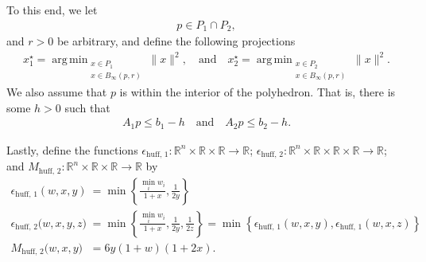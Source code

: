 \documentclass{article}
\newenvironment{comment}
  {\par\medskip
   \color{red}%
   \begin{framed}
   \textbf{Comment: }\ignorespaces}
 {\end{framed}
  \medskip}
\newtheorem{lemma}[theorem]{Lemma}
\theoremstyle{case}
\numberwithin{theorem}{subsection}
\DeclareMathOperator*{\argmin}{arg\,min}
\newcommand{\ehuffo}{{\epsilon_{\textrm{huff, 1}}}}
\newcommand{\ehufft}{{\epsilon_{\textrm{huff, 2}}}}
\newcommand{\mhufft}{{M_{\textrm{huff, 2}}}}
\newcommand{\bpr}{{B_{\infty}\left(p, r\right)}}
\newcommand{\reals}{\mathbb R}
\newcommand{\Rm}{\mathbb R^m}
\newcommand{\Rn}{\mathbb R^n}
\begin{document}
To this end, we let 
\begin{align}
p \in P_1\cap P_2,
\label{bap_define_ps}
\end{align} and $r>0$ be arbitrary, 
and define the following projections
\begin{align}
x_1^{\star} = \argmin_{
\substack{x\in P_1 \\ x \in \bpr }
}\|x\|^2, 
\quad \textrm{and} \quad
x_2^{\star} = \argmin_{
\substack{x\in P_2 \\ x \in \bpr }
}\|x\|^2.
\label{bap_define_the_projections}
\end{align}
We also assume that $p$ is within the interior of the polyhedron.
That is, there is some $h > 0$ such that 
\begin{align}
\label{bap_feasible_by_h}
A_1 p \le b_1 - h
\quad \textrm{and} \quad
A_2 p \le b_2 - h.
\end{align}

Lastly, define the functions
$\ehuffo : \Rn \times \reals \times \reals \to \reals$;
$\ehufft : \Rn \times \reals \times \reals \times \reals \to \reals$; and 
$\mhufft : \Rn \times \reals \times \reals \to \reals$
by
\begin{align}
\ehuffo\left(w, x, y\right) &= \min\left\{\frac{\min_i w_i}{1 + x}, \frac 1 {2y}\right\} \label{define_ehuffo} \\
\ehufft\big(w, x, y, z\big) &= \min\left\{\frac{\min_i w_i}{1 + x}, \frac 1 {2y}, \frac 1 {2z}\right\} = \min\left\{\ehuffo\left(w, x, y\right), \ehuffo\left(w, x, z\right) \right\} \label{define_ehufft} \\
\mhufft \big(w, x, y \big) &= 6y \left(1 + w\right) \left(1 + 2 x\right). \label{define_mhufft}
\end{align}


% 
\end{document}
